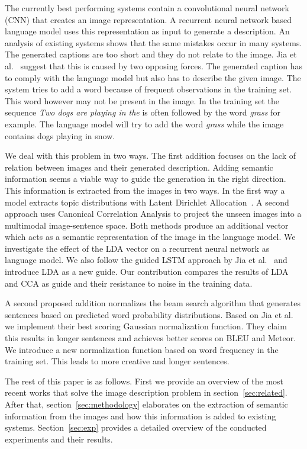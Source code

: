\documentclass[twoside,twocolumn]{article}
\begin{document}
	The currently best performing systems contain a convolutional neural network (CNN) that creates an image representation. A recurrent neural network based language model uses this representation as input to generate a description.
	An analysis of existing systems shows that the same mistakes occur in many systems. The generated captions are too short and they do not relate to the image. Jia et al.~\cite{Fernando2015} suggest that this is caused by two opposing forces. The generated caption has to comply with the language model but also has to describe the given image. The system tries to add a word because of frequent observations in the training set. This word however may not be present in the image. In the training set the sequence \emph{Two dogs are playing in the} is often followed by the word \emph{grass} for example. The language model will try to add the word \emph{grass} while the image contains dogs playing in snow.
	
	We deal with this problem in two ways. The first addition focuses on the lack of relation between images and their generated description. Adding semantic information seems a viable way to guide the generation in the right direction. This information is extracted from the images in two ways. In the first way a model extracts topic distributions with Latent Dirichlet Allocation~\cite{Blei2012}. A second approach uses Canonical Correlation Analysis to project the unseen images into a multimodal image-sentence space. Both methods produce an additional vector which acts as a semantic representation of the image in the language model. We investigate the effect of the LDA vector on a recurrent neural network as language model. We also follow the guided LSTM approach by Jia et al.~\cite{Fernando2015} and introduce LDA as a new guide. Our contribution compares the results of LDA and CCA as guide and their resistance to noise in the training data.
	
	A second proposed addition normalizes the beam search algorithm that generates sentences based on predicted word probability distributions. Based on Jia et al.~\cite{Fernando2015} we implement their best scoring Gaussian normalization function. They claim this results in longer sentences and achieves better scores on BLEU and Meteor. We introduce a new normalization function based on word frequency in the training set. This leads to more creative and longer sentences. 
	
	The rest of this paper is as follows. First we provide an overview of the most recent works that solve the image description problem in section~\ref{sec:related}. After that, section~\ref{sec:methodology} elaborates on the extraction of semantic information from the images and how this information is added to existing systems. Section~\ref{sec:exp} provides a detailed overview of the conducted experiments and their results. 
	
\end{document}
